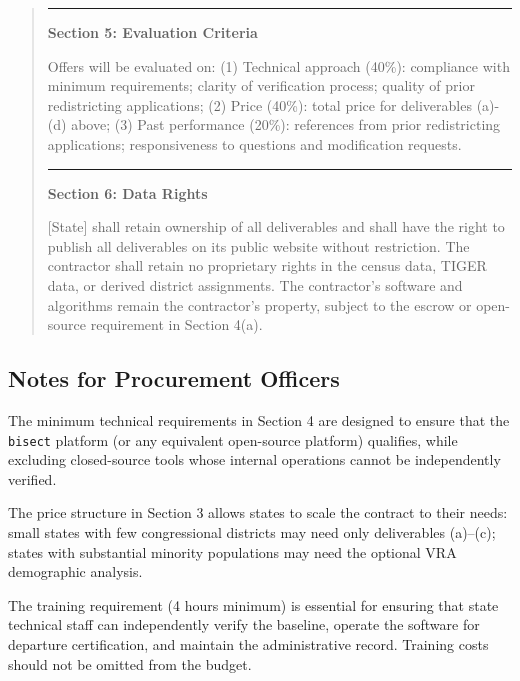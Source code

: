 \begin{quote}
\rule{\linewidth}{0.4pt}

\textbf{Section 5: Evaluation Criteria}

Offers will be evaluated on: (1) Technical approach (40\%): compliance with minimum requirements; clarity of verification process; quality of prior redistricting applications; (2) Price (40\%): total price for deliverables (a)-(d) above; (3) Past performance (20\%): references from prior redistricting applications; responsiveness to questions and modification requests.

\rule{\linewidth}{0.4pt}

\textbf{Section 6: Data Rights}

[State] shall retain ownership of all deliverables and shall have the right to publish all deliverables on its public website without restriction. The contractor shall retain no proprietary rights in the census data, TIGER data, or derived district assignments. The contractor's software and algorithms remain the contractor's property, subject to the escrow or open-source requirement in Section 4(a).
\end{quote}

\subsection{Notes for Procurement Officers}

The minimum technical requirements in Section 4 are designed to ensure that the \texttt{bisect} platform (or any equivalent open-source platform) qualifies, while excluding closed-source tools whose internal operations cannot be independently verified.

The price structure in Section 3 allows states to scale the contract to their needs: small states with few congressional districts may need only deliverables (a)--(c); states with substantial minority populations may need the optional VRA demographic analysis.

The training requirement (4 hours minimum) is essential for ensuring that state technical staff can independently verify the baseline, operate the software for departure certification, and maintain the administrative record. Training costs should not be omitted from the budget.

